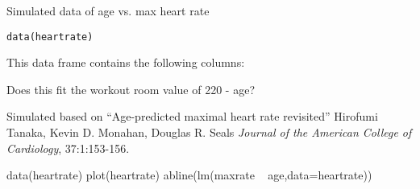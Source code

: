\begin{Description}\relax
Simulated data of age vs. max heart rate
\end{Description}
\begin{Usage}
\begin{verbatim}data(heartrate)\end{verbatim}
\end{Usage}
\begin{Format}\relax
This data frame contains the following columns:
\end{Format}
\begin{Details}\relax
Does this fit the workout room value of 220 - age?
\end{Details}
\begin{Source}\relax
Simulated based on ``Age-predicted maximal heart
rate revisited'' Hirofumi Tanaka, Kevin D. Monahan, Douglas R.
Seals \textit{Journal of the American College of Cardiology},
37:1:153-156.
\end{Source}
\begin{Examples}
\begin{ExampleCode}
data(heartrate)
plot(heartrate)
abline(lm(maxrate ~ age,data=heartrate))
\end{ExampleCode}
\end{Examples}

